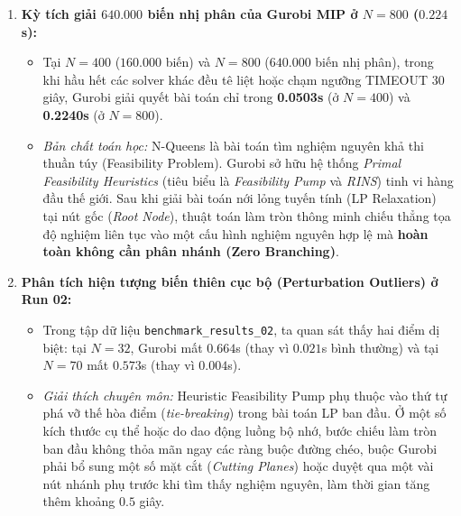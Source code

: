 \documentclass[a4paper,11pt]{article}
\begin{document}
\begin{enumerate}
    \item \textbf{Kỳ tích giải $640.000$ biến nhị phân của Gurobi MIP ở $N=800$ ($0.224$s):}
    \begin{itemize}
        \item Tại $N = 400$ ($160.000$ biến) và $N = 800$ ($\mathbf{640.000}$ biến nhị phân), trong khi hầu hết các solver khác đều tê liệt hoặc chạm ngưỡng TIMEOUT 30 giây, Gurobi giải quyết bài toán chỉ trong \textbf{0.0503s} (ở $N=400$) và \textbf{0.2240s} (ở $N=800$).
        \item \textit{Bản chất toán học:} N-Queens là bài toán tìm nghiệm nguyên khả thi thuần túy (Feasibility Problem). Gurobi sở hữu hệ thống \textit{Primal Feasibility Heuristics} (tiêu biểu là \textit{Feasibility Pump} và \textit{RINS}) tinh vi hàng đầu thế giới. Sau khi giải bài toán nới lỏng tuyến tính (LP Relaxation) tại nút gốc (\textit{Root Node}), thuật toán làm tròn thông minh chiếu thẳng tọa độ nghiệm liên tục vào một cấu hình nghiệm nguyên hợp lệ mà \textbf{hoàn toàn không cần phân nhánh (Zero Branching)}.
    \end{itemize}

    \item \textbf{Phân tích hiện tượng biến thiên cục bộ (Perturbation Outliers) ở Run 02:}
    \begin{itemize}
        \item Trong tập dữ liệu \texttt{benchmark\_results\_02}, ta quan sát thấy hai điểm dị biệt: tại $N=32$, Gurobi mất $0.664$s (thay vì $0.021$s bình thường) và tại $N=70$ mất $0.573$s (thay vì $0.004$s).
        \item \textit{Giải thích chuyên môn:} Heuristic Feasibility Pump phụ thuộc vào thứ tự phá vỡ thế hòa điểm (\textit{tie-breaking}) trong bài toán LP ban đầu. Ở một số kích thước cụ thể hoặc do dao động luồng bộ nhớ, bước chiếu làm tròn ban đầu không thỏa mãn ngay các ràng buộc đường chéo, buộc Gurobi phải bổ sung một số mặt cắt (\textit{Cutting Planes}) hoặc duyệt qua một vài nút nhánh phụ trước khi tìm thấy nghiệm nguyên, làm thời gian tăng thêm khoảng $0.5$ giây.
    \end{itemize}


\end{enumerate}
\end{document}
